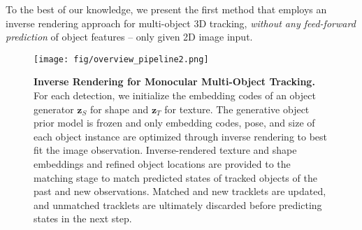 To the best of our knowledge, we present the first method that employs an inverse rendering approach for multi-object 3D tracking, \emph{without any feed-forward prediction} of object features -- only given 2D image input.

\begin{figure}[tb!]
    \centering
    \texttt{[image: fig/overview\_pipeline2.png]}
    \vspace*{-6pt}
    \caption{\textbf{Inverse Rendering for Monocular Multi-Object Tracking.} For each detection, we initialize the embedding codes of an object generator $\mathbf{z}_S$ for shape and $\mathbf{z}_T$ for texture. The generative object prior model is frozen and only embedding codes, pose, and size of each object instance are optimized through inverse rendering to best fit the image observation. Inverse-rendered texture and shape embeddings and refined object locations are provided to the matching stage to match predicted states of tracked objects of the past and new observations. Matched and new tracklets are updated, and unmatched tracklets are ultimately discarded before predicting states in the next step.}
    \label{fig:pipeline}
    \vspace*{-14pt}
\end{figure}